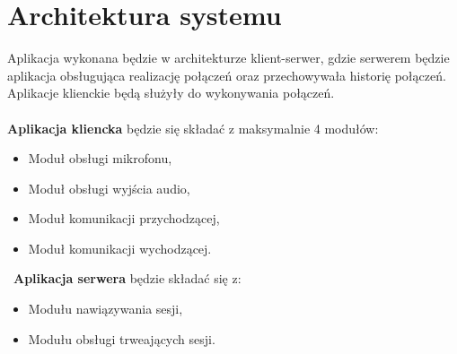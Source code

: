 \section{Architektura systemu}

Aplikacja wykonana będzie w architekturze klient-serwer, gdzie serwerem będzie aplikacja obsługująca realizację
połączeń oraz przechowywała historię połączeń.
Aplikacje klienckie będą służyły do wykonywania połączeń.
\\
\\
\textbf{Aplikacja kliencka} będzie się składać z maksymalnie 4 modułów:
\begin{itemize}
	\item Moduł obsługi mikrofonu,
	\item Moduł obsługi wyjścia audio,
	\item Moduł komunikacji przychodzącej,
	\item Moduł komunikacji wychodzącej.
\end{itemize}
\
\textbf{Aplikacja serwera} będzie składać się z:
\begin{itemize}
	\item Modułu nawiązywania sesji,
	\item Modułu obsługi trweających sesji.
\end{itemize}